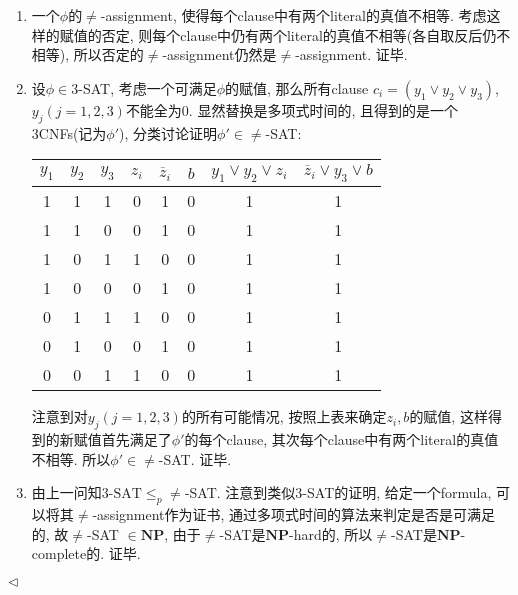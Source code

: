 \documentclass[11pt]{article}
\newcommand{\NP}{\mathbf{NP}}
\newenvironment{answer}[1][Answer]{\begin{trivlist}
\item[\hskip \labelsep{\bfseries\itshape#1.}\hskip \labelsep]}{\hfill$\lhd$\end{trivlist}}
\begin{document}
\begin{answer}
    \begin{enumerate}[label = \alph*.)]
        \item 一个$\phi$的$\neq$-assignment, 使得每个clause中有两个literal的真值不相等. 考虑这样的赋值的否定, 则每个clause中仍有两个literal的真值不相等(各自取反后仍不相等), 所以否定的$\neq$-assignment仍然是$\neq$-assignment. 证毕.
        \item 设$\phi \in 3$-SAT, 考虑一个可满足$\phi$的赋值, 那么所有clause $c_i = (y_1\lor y_2\lor y_3)$, $y_j(j=1,2,3)$不能全为0. 显然替换是多项式时间的, 且得到的是一个3CNFs(记为$\phi'$), 分类讨论证明$\phi' \in \neq$-SAT:
        \begin{table}[H]
            \centering
            \begin{tabular}{c|c|c|c|c|c|c|c}
                \toprule
                $y_1$ & $y_2$ & $y_3$ & $z_i$ & $\overline{z}_i $& $b$ & $y_1\lor y_2\lor z_i$ & $\overline{z}_i\lor y_3\lor b$ \\
                \midrule
                1 & 1 & 1 & 0 & 1 & 0 & 1 & 1 \\
                1 & 1 & 0 & 0 & 1 & 0 & 1 & 1 \\
                1 & 0 & 1 & 1 & 0 & 0 & 1 & 1 \\
                1 & 0 & 0 & 0 & 1 & 0 & 1 & 1 \\
                0 & 1 & 1 & 1 & 0 & 0 & 1 & 1 \\
                0 & 1 & 0 & 0 & 1 & 0 & 1 & 1 \\
                0 & 0 & 1 & 1 & 0 & 0 & 1 & 1 \\
                \bottomrule
            \end{tabular}
        \end{table}
        注意到对$y_j(j=1,2,3)$的所有可能情况, 按照上表来确定$z_i, b$的赋值, 这样得到的新赋值首先满足了$\phi'$的每个clause, 其次每个clause中有两个literal的真值不相等. 所以$\phi' \in \neq$-SAT. 证毕.
        \item 由上一问知$3\text{-SAT} \le_p \neq$-SAT. 注意到类似$3$-SAT的证明, 给定一个formula, 可以将其$\neq$-assignment作为证书, 通过多项式时间的算法来判定是否是可满足的, 故$\neq$-SAT $ \in \NP$, 由于$\neq$-SAT是$\NP$-hard的, 所以$\neq$-SAT是$\NP$-complete的. 证毕.
    \end{enumerate}
\end{answer}
\end{document}
